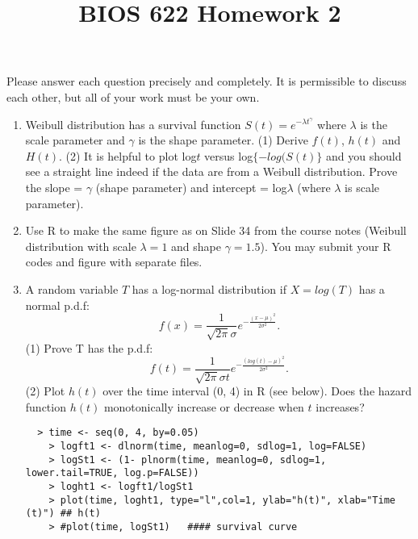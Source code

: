 
\setlength{\oddsidemargin}{0.01in}
\setlength{\textwidth}{6.5in}
\setlength{\topmargin}{-0.51in}
\setlength{\textheight}{8.5in}


\def\bebf{\mbox{\boldmath $\beta$}}
\def\mubf{\mbox{\boldmath $\mu$}}
\def\epbf{\mbox{\scriptsize\boldmath $\epsilon$}}
\def\mus{\mbox{\scriptsize\boldmath $\mu$}}

\title{BIOS 622 Homework 2}

\maketitle

\baselineskip=15pt
\parskip 12pt

Please answer each question precisely and completely. It is permissible to discuss each other, but all of your work must be your own.  

\begin{enumerate}

\item Weibull distribution has a survival function $S(t) = e^{-\lambda t ^{\gamma}}$ where $\lambda$ is the scale parameter and $\gamma$ is the shape parameter. (1) Derive $f(t)$, $h(t)$ and $H(t)$. (2) It is helpful to plot log$t$ versus log$\{-log(S(t)\}$ and you should see a straight line indeed if the data are from a Weibull distribution. Prove the slope = $\gamma$ (shape parameter) and intercept = log$\lambda$ (where $\lambda$ is scale parameter).


\item Use R to make the same figure as on Slide 34 from the course notes (Weibull distribution with scale $\lambda = 1$ and shape $\gamma = 1.5$). You may submit your R codes and figure with separate files.


\item A random variable $T$ has a log-normal distribution if $X = log(T)$ has a normal p.d.f:
$$
f(x) = \frac{1}{\sqrt{2\pi} \sigma} e ^{ - \frac{(x - \mu)^2}{2\sigma^2}}.
$$
(1) Prove T has the p.d.f: 
$$
f(t) = \frac{1}{\sqrt{2\pi} \sigma t} e ^{ - \frac{(log(t) - \mu)^2}{2\sigma^2}}.
$$
(2) Plot $h(t)$ over the time interval (0, 4) in R (see below). Does the hazard function $h(t)$ monotonically increase or decrease when $t$ increases?


\begin{verbatim}
  > time <- seq(0, 4, by=0.05)
	> logft1 <- dlnorm(time, meanlog=0, sdlog=1, log=FALSE)
	> logSt1 <- (1- plnorm(time, meanlog=0, sdlog=1, lower.tail=TRUE, log.p=FALSE))
	> loght1 <- logft1/logSt1
	> plot(time, loght1, type="l",col=1, ylab="h(t)", xlab="Time (t)") ## h(t)
	> #plot(time, logSt1)   #### survival curve
    \end{verbatim}

\end{enumerate}









